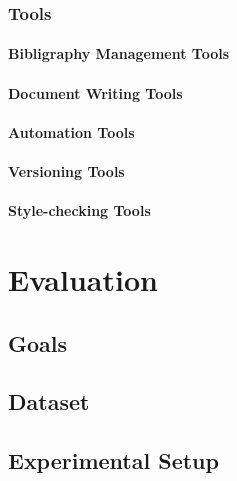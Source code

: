 \documentclass[a4paper]{memoir}
\begin{document}
\subsection{Tools}
\label{sec:tools}

\subsubsection{Bibligraphy Management Tools}
\label{sec:bibliography-management}

\subsubsection{Document Writing Tools}
\label{sec:document-writing}

\subsubsection{Automation Tools}
\label{sec:automation-tools}

\subsubsection{Versioning Tools}
\label{sec:versioning-tools}

\subsubsection{Style-checking Tools}
\label{sec:style-checking-tools}


\chapter{Evaluation}
\label{cha:evaluation}

\section{Goals}
\label{sec:evaluation-goals}

\section{Dataset}
\label{sec:dataset}

\section{Experimental Setup}
\label{sec:experimental-setup}
\end{document}
